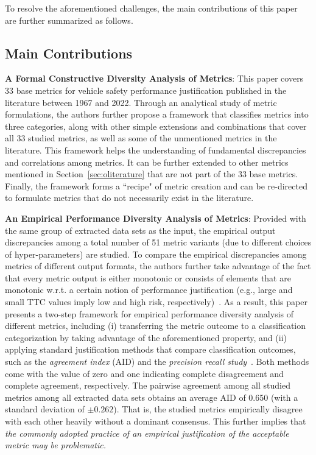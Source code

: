 \documentclass[journal]{IEEEtran}
\begin{document}
To resolve the aforementioned challenges, the main contributions of this paper are further summarized as follows.

\subsection{Main Contributions}
\textbf{A Formal Constructive Diversity Analysis of Metrics}: This paper covers 33 base metrics for vehicle safety performance justification published in the literature between 1967 and 2022. Through an analytical study of metric formulations, the authors further propose a framework that classifies metrics into three categories, along with other simple extensions and combinations that cover all 33 studied metrics, as well as some of the unmentioned metrics in the literature. This framework helps the understanding of fundamental discrepancies and correlations among metrics. It can be further extended to other metrics mentioned in Section~\ref{sec:oliterature} that are not part of the 33 base metrics. Finally, the framework forms a ``recipe" of metric creation and can be re-directed to formulate metrics that do not necessarily exist in the literature. 

\textbf{An Empirical Performance Diversity Analysis of Metrics}: Provided with the same group of extracted data sets as the input, the empirical output discrepancies among a total number of 51 metric variants (due to different choices of hyper-parameters) are studied. To compare the empirical discrepancies among metrics of different output formats, the authors further take advantage of the fact that every metric output is either monotonic or consists of elements that are monotonic w.r.t. a certain notion of performance justification (e.g., large and small TTC values imply low and high risk, respectively)~\cite{hayward1972near, weng2020model, uno2002microscopic, okamura2011impact, cooper1976traffic, chin1992quantitative, Jansson2005CollisionAT, cunto2008assessing, oh2006method, barcelo2003safety, kalra2016driving}. As a result, this paper presents a two-step framework for empirical performance diversity analysis of different metrics, including (i) transferring the metric outcome to a classification categorization by taking advantage of the aforementioned property, and (ii) applying standard justification methods that compare classification outcomes, such as the \emph{agreement index} (AID) and the \emph{precision recall study}~\cite{saito2015precision}. Both methods come with the value of zero and one indicating complete disagreement and complete agreement, respectively. The pairwise agreement among all studied metrics among all extracted data sets obtains an average AID of 0.650 (with a standard deviation of $\pm 0.262$). That is, the studied metrics empirically disagree with each other heavily without a dominant consensus. This further implies that \emph{the commonly adopted practice of an empirical justification of the acceptable metric may be problematic.}
\end{document}
